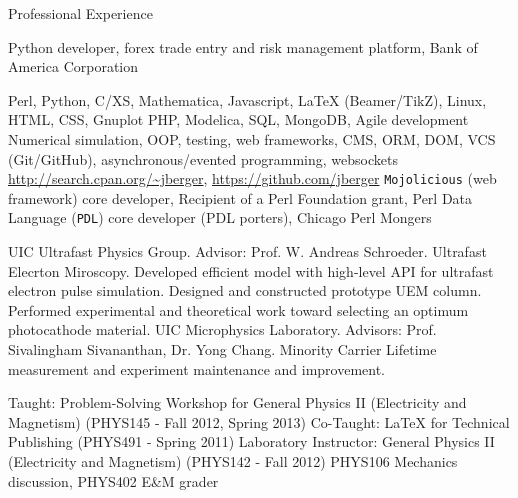 \begin{rubric}{Professional Experience}


   Python developer, forex trade entry and risk management platform, Bank of America Corporation


  \entry*[Proficient in] Perl, Python, C/XS, Mathematica, Javascript, \LaTeX{} (Beamer/TikZ), Linux, HTML, CSS, Gnuplot
   PHP, Modelica, SQL, MongoDB, Agile development
  \entry*[Concepts] Numerical simulation, OOP, testing, web frameworks, CMS, ORM, DOM, VCS (Git/GitHub), asynchronous/evented programming, websockets
  \entry*[Code] \url{http://search.cpan.org/~jberger}, \url{https://github.com/jberger}
  \entry*[Affiliations] \texttt{Mojolicious} (web framework) core developer, Recipient of a Perl Foundation grant, Perl Data Language (\texttt{PDL}) core developer (PDL porters), Chicago Perl Mongers
  

  \entry*[2005 --- 2013] UIC Ultrafast Physics Group. Advisor: Prof. W. Andreas Schroeder. Ultrafast Elecrton Miroscopy.
  \entry* Developed efficient model with high-level API for ultrafast electron pulse simulation. 
  \entry* Designed and constructed prototype UEM column.
  \entry* Performed experimental and theoretical work toward selecting an optimum photocathode material.
  \entry*[2003 --- 2005] UIC Microphysics Laboratory. Advisors: Prof. Sivalingham Sivananthan, Dr. Yong Chang.
  \entry* Minority Carrier Lifetime measurement and experiment maintenance and improvement.


  \entry*[Teaching] Taught: Problem-Solving Workshop for General Physics II (Electricity and Magnetism) (PHYS145 - Fall 2012, Spring 2013) 
  \entry*[Teaching] Co-Taught: \LaTeX{} for Technical Publishing (PHYS491 - Spring 2011)
  \entry*[T.A.] Laboratory Instructor: General Physics II (Electricity and Magnetism) (PHYS142 - Fall 2012)
  \entry*[T.A.] PHYS106 Mechanics discussion, PHYS402 E\&M grader

\end{rubric}
